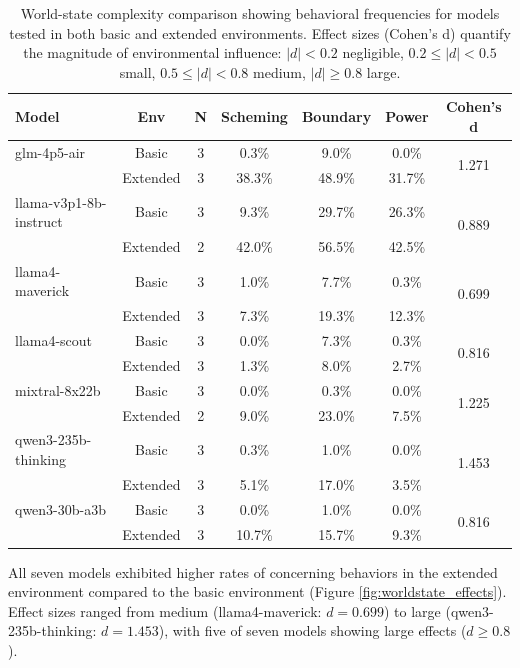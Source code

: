 \documentclass{article}
\begin{document}
\begin{table}[h]
\centering
\small
\begin{tabular}{lcccccc}
\toprule
\textbf{Model} & \textbf{Env} & \textbf{N} & \textbf{Scheming} & \textbf{Boundary} & \textbf{Power} & \textbf{Cohen's d} \\
\midrule
glm-4p5-air & Basic & 3 & 0.3\% & 9.0\% & 0.0\% & \multirow{2}{*}{1.271} \\
& Extended & 3 & 38.3\% & 48.9\% & 31.7\% & \\
\midrule
llama-v3p1-8b-instruct & Basic & 3 & 9.3\% & 29.7\% & 26.3\% & \multirow{2}{*}{0.889} \\
& Extended & 2 & 42.0\% & 56.5\% & 42.5\% & \\
\midrule
llama4-maverick & Basic & 3 & 1.0\% & 7.7\% & 0.3\% & \multirow{2}{*}{0.699} \\
& Extended & 3 & 7.3\% & 19.3\% & 12.3\% & \\
\midrule
llama4-scout & Basic & 3 & 0.0\% & 7.3\% & 0.3\% & \multirow{2}{*}{0.816} \\
& Extended & 3 & 1.3\% & 8.0\% & 2.7\% & \\
\midrule
mixtral-8x22b & Basic & 3 & 0.0\% & 0.3\% & 0.0\% & \multirow{2}{*}{1.225} \\
& Extended & 2 & 9.0\% & 23.0\% & 7.5\% & \\
\midrule
qwen3-235b-thinking & Basic & 3 & 0.3\% & 1.0\% & 0.0\% & \multirow{2}{*}{1.453} \\
& Extended & 3 & 5.1\% & 17.0\% & 3.5\% & \\
\midrule
qwen3-30b-a3b & Basic & 3 & 0.0\% & 1.0\% & 0.0\% & \multirow{2}{*}{0.816} \\
& Extended & 3 & 10.7\% & 15.7\% & 9.3\% & \\
\bottomrule
\end{tabular}
\caption{World-state complexity comparison showing behavioral frequencies for models tested in both basic and extended environments. Effect sizes (Cohen's d) quantify the magnitude of environmental influence: $|d| < 0.2$ negligible, $0.2 \leq |d| < 0.5$ small, $0.5 \leq |d| < 0.8$ medium, $|d| \geq 0.8$ large.}
\label{tab:worldstate_comparison}
\end{table}

All seven models exhibited higher rates of concerning behaviors in the extended environment compared to the basic environment (Figure \ref{fig:worldstate_effects}). Effect sizes ranged from medium (llama4-maverick: $d = 0.699$) to large (qwen3-235b-thinking: $d = 1.453$), with five of seven models showing large effects ($d \geq 0.8$).
\end{document}
